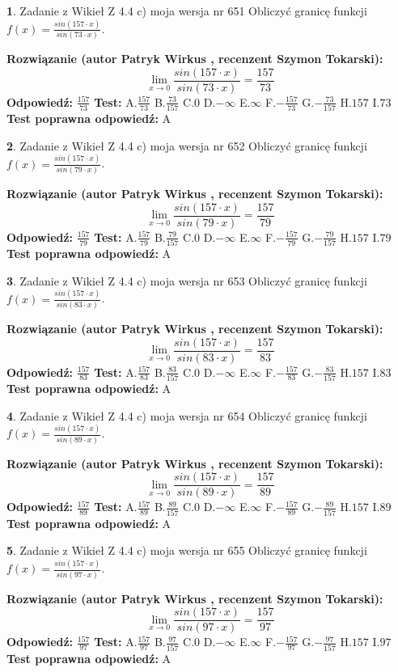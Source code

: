 \documentclass[12pt, a4paper]{article}
\theoremstyle{definition} %
\newtheorem{zad}{}
\newcommand{\zadStart}[1]{\begin{zad}#1\newline}
\newcommand{\zadStop}{\end{zad}}
\newcommand{\rozwStart}[2]{\noindent \textbf{Rozwiązanie (autor #1 , recenzent #2): }\newline}
\newcommand{\rozwStop}{\newline}
\newcommand{\odpStart}{\noindent \textbf{Odpowiedź:}\newline}
\newcommand{\odpStop}{\newline}
\newcommand{\testStart}{\noindent \textbf{Test:}\newline}
\newcommand{\testStop}{\newline}
\newcommand{\kluczStart}{\noindent \textbf{Test poprawna odpowiedź:}\newline}
\newcommand{\kluczStop}{\newline}
\begin{document}
\zadStart{Zadanie z Wikieł Z 4.4 c) moja wersja nr 651}
Obliczyć granicę funkcji $f(x)=\frac{sin(157\cdot x)}{sin(73\cdot x)}$.
\zadStop
\rozwStart{Patryk Wirkus}{Szymon Tokarski}
$$\lim\limits_{x\to 0}\frac{sin(157\cdot x)}{sin(73\cdot x)}=
\frac{157}{73}$$
\rozwStop
\odpStart
$\frac{157}{73}$
\odpStop
\testStart
A.$\frac{157}{73}$
B.$\frac{73}{157}$
C.$0$
D.$-\infty$
E.$\infty$
F.$-\frac{157}{73}$
G.$-\frac{73}{157}$
H.$157$
I.$73$
\testStop
\kluczStart
A
\kluczStop



\zadStart{Zadanie z Wikieł Z 4.4 c) moja wersja nr 652}
Obliczyć granicę funkcji $f(x)=\frac{sin(157\cdot x)}{sin(79\cdot x)}$.
\zadStop
\rozwStart{Patryk Wirkus}{Szymon Tokarski}
$$\lim\limits_{x\to 0}\frac{sin(157\cdot x)}{sin(79\cdot x)}=
\frac{157}{79}$$
\rozwStop
\odpStart
$\frac{157}{79}$
\odpStop
\testStart
A.$\frac{157}{79}$
B.$\frac{79}{157}$
C.$0$
D.$-\infty$
E.$\infty$
F.$-\frac{157}{79}$
G.$-\frac{79}{157}$
H.$157$
I.$79$
\testStop
\kluczStart
A
\kluczStop



\zadStart{Zadanie z Wikieł Z 4.4 c) moja wersja nr 653}
Obliczyć granicę funkcji $f(x)=\frac{sin(157\cdot x)}{sin(83\cdot x)}$.
\zadStop
\rozwStart{Patryk Wirkus}{Szymon Tokarski}
$$\lim\limits_{x\to 0}\frac{sin(157\cdot x)}{sin(83\cdot x)}=
\frac{157}{83}$$
\rozwStop
\odpStart
$\frac{157}{83}$
\odpStop
\testStart
A.$\frac{157}{83}$
B.$\frac{83}{157}$
C.$0$
D.$-\infty$
E.$\infty$
F.$-\frac{157}{83}$
G.$-\frac{83}{157}$
H.$157$
I.$83$
\testStop
\kluczStart
A
\kluczStop



\zadStart{Zadanie z Wikieł Z 4.4 c) moja wersja nr 654}
Obliczyć granicę funkcji $f(x)=\frac{sin(157\cdot x)}{sin(89\cdot x)}$.
\zadStop
\rozwStart{Patryk Wirkus}{Szymon Tokarski}
$$\lim\limits_{x\to 0}\frac{sin(157\cdot x)}{sin(89\cdot x)}=
\frac{157}{89}$$
\rozwStop
\odpStart
$\frac{157}{89}$
\odpStop
\testStart
A.$\frac{157}{89}$
B.$\frac{89}{157}$
C.$0$
D.$-\infty$
E.$\infty$
F.$-\frac{157}{89}$
G.$-\frac{89}{157}$
H.$157$
I.$89$
\testStop
\kluczStart
A
\kluczStop



\zadStart{Zadanie z Wikieł Z 4.4 c) moja wersja nr 655}
Obliczyć granicę funkcji $f(x)=\frac{sin(157\cdot x)}{sin(97\cdot x)}$.
\zadStop
\rozwStart{Patryk Wirkus}{Szymon Tokarski}
$$\lim\limits_{x\to 0}\frac{sin(157\cdot x)}{sin(97\cdot x)}=
\frac{157}{97}$$
\rozwStop
\odpStart
$\frac{157}{97}$
\odpStop
\testStart
A.$\frac{157}{97}$
B.$\frac{97}{157}$
C.$0$
D.$-\infty$
E.$\infty$
F.$-\frac{157}{97}$
G.$-\frac{97}{157}$
H.$157$
I.$97$
\testStop
\kluczStart
A
\kluczStop
\end{document}
